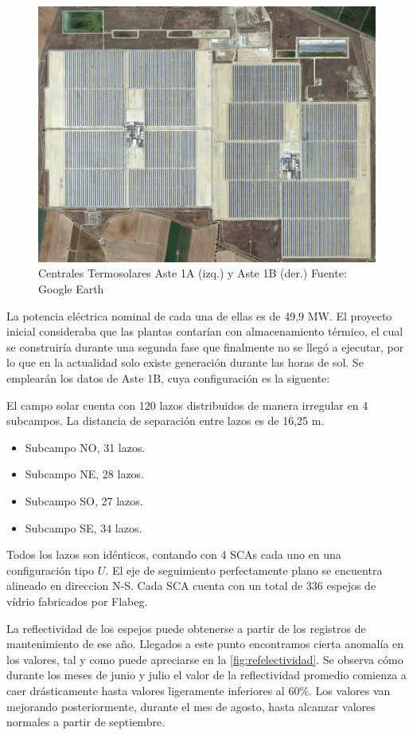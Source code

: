 \begin{figure}[h!]
\includegraphics[width=0.9\linewidth]{images/fotoAstes.png}
\caption{Centrales Termosolares Aste 1A (izq.) y Aste 1B (der.) Fuente: Google Earth} 
\label{fig:astes}
\end{figure}

La potencia eléctrica nominal de cada una de ellas es de 49,9 MW. El proyecto inicial consideraba que las plantas contarían con almacenamiento térmico, el cual se construiría durante una segunda fase que finalmente no se llegó a ejecutar, por lo que en la actualidad solo existe generación durante las horas de sol. Se emplearán los datos de Aste 1B, cuya configuración es la siguente:

El campo solar cuenta con 120 lazos distribuidos de manera irregular en 4 subcampos. La  distancia de separación entre lazos es de 16,25 m. 

\begin{itemize}[itemsep=2pt,parsep=2pt]
\item
  Subcampo NO, 31 lazos.
\item
  Subcampo NE, 28 lazos.
\item
  Subcampo SO, 27 lazos.
\item
  Subcampo SE, 34 lazos.
\end{itemize}

Todos los lazos son idénticos, contando con 4 SCAs cada uno en una configuración tipo \(U\). El eje de seguimiento perfectamente plano se encuentra alineado en direccion N-S. Cada SCA cuenta con un total de 336 espejos de vídrio fabricados por Flabeg. 

La reflectividad de los espejos puede obtenerse a partir de los registros de mantenimiento de ese año. Llegados a este punto encontramos cierta anomalía en los valores, tal y como puede apreciarse en la \ref{fig:refelectividad}. Se observa cómo durante los meses de junio y julio el valor de la reflectividad promedio comienza a caer drásticamente hasta valores ligeramente inferiores al 60\%. Los valores van mejorando posteriormente, durante el mes de agosto, hasta alcanzar valores normales a partir de septiembre.


